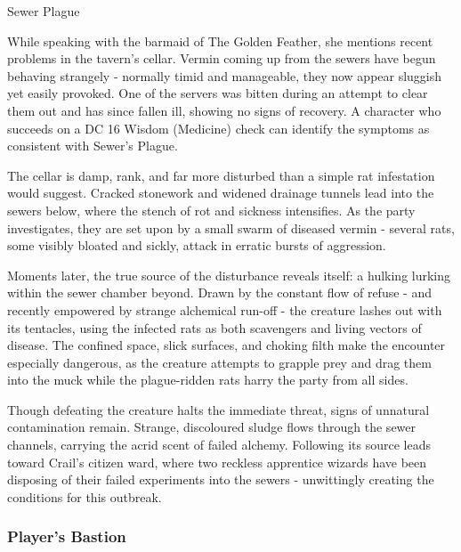 \begin{DndQuestHook}[width=0.5\textwidth - 4pt]{Sewer Plague}
	\DndQuestHookBasics[%
		location = {The Golden Feather Tavern - Crail},%
		quest-giver = {Bar Maiden},%
		objective = {Find out why the rats in the sewers behave unnaturally}%
	]%
	
	{\noindent\entryfont While speaking with the barmaid of The Golden Feather, she mentions recent problems in the tavern's cellar. Vermin coming up from the sewers have begun behaving strangely - normally timid and manageable, they now appear sluggish yet easily provoked. One of the servers was bitten during an attempt to clear them out and has since fallen ill, showing no signs of recovery. A character who succeeds on a DC 16 Wisdom (Medicine) check can identify the symptoms as consistent with Sewer's Plague.
	
	The cellar is damp, rank, and far more disturbed than a simple rat infestation would suggest. Cracked stonework and widened drainage tunnels lead into the sewers below, where the stench of rot and sickness intensifies. As the party investigates, they are set upon by a small swarm of diseased vermin - several rats, some visibly bloated and sickly, attack in erratic bursts of aggression.

	Moments later, the true source of the disturbance reveals itself: a hulking \hyperref[monster:OtyughSewerPlague]{} lurking within the sewer chamber beyond. Drawn by the constant flow of refuse - and recently empowered by strange alchemical run-off - the creature lashes out with its tentacles, using the infected rats as both scavengers and living vectors of disease. The confined space, slick surfaces, and choking filth make the encounter especially dangerous, as the creature attempts to grapple prey and drag them into the muck while the plague-ridden rats harry the party from all sides.

	Though defeating the creature halts the immediate threat, signs of unnatural contamination remain. Strange, discoloured sludge flows through the sewer channels, carrying the acrid scent of failed alchemy. Following its source leads toward Crail's citizen ward, where two reckless apprentice wizards have been disposing of their failed experiments into the sewers - unwittingly creating the conditions for this outbreak.}
\end{DndQuestHook}
\subsubsection*{ Player's Bastion}
